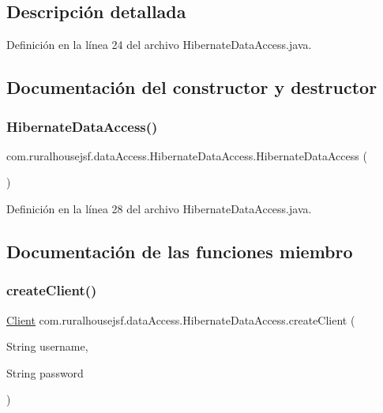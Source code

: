 \subsection{Descripción detallada}


Definición en la línea 24 del archivo Hibernate\+Data\+Access.\+java.



\subsection{Documentación del constructor y destructor}
\mbox{\label{classcom_1_1ruralhousejsf_1_1data_access_1_1_hibernate_data_access_a8e0ec929d78d37a992837db0ba7e9602}} 
\subsubsection{\texorpdfstring{HibernateDataAccess()}{HibernateDataAccess()}}
{\footnotesize\ttfamily com.\+ruralhousejsf.\+data\+Access.\+Hibernate\+Data\+Access.\+Hibernate\+Data\+Access (\begin{DoxyParamCaption}{ }\end{DoxyParamCaption})}



Definición en la línea 28 del archivo Hibernate\+Data\+Access.\+java.



\subsection{Documentación de las funciones miembro}
\mbox{\label{classcom_1_1ruralhousejsf_1_1data_access_1_1_hibernate_data_access_ab1113c4a35f6f888d6bee15f25b117d5}} 
\subsubsection{\texorpdfstring{createClient()}{createClient()}}
{\footnotesize\ttfamily \mbox{\hyperlink{classcom_1_1ruralhousejsf_1_1domain_1_1_client}{Client}} com.\+ruralhousejsf.\+data\+Access.\+Hibernate\+Data\+Access.\+create\+Client (\begin{DoxyParamCaption}\item[{String}]{username,  }\item[{String}]{password }\end{DoxyParamCaption})}

